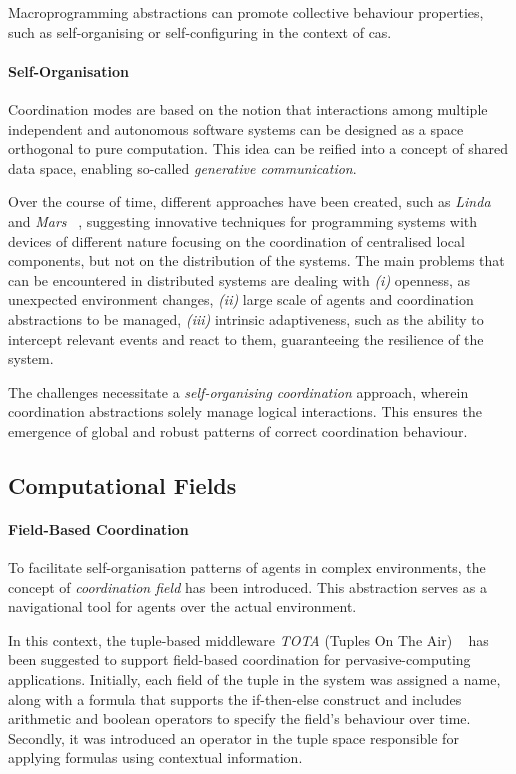 Macroprogramming abstractions can promote collective behaviour properties, such as self-organising or self-configuring in
the context of \ac{cas}.

\paragraph{Self-Organisation}
Coordination modes are based on the notion that interactions among multiple independent and autonomous software systems
can be designed as a space orthogonal to pure computation.
This idea can be reified into a concept of shared data space, enabling so-called \emph{generative communication}.

Over the course of time, different approaches have been created, such as \emph{Linda} ~\cite{10.1145/2363.2433} and \emph{Mars} ~\cite{865084},
suggesting innovative techniques for programming systems with devices of different nature focusing on the coordination
of centralised local components, but not on the distribution of the systems.
The main problems that can be encountered in distributed systems are dealing with
    \emph{(i)} openness, as unexpected environment changes,
    \emph{(ii)} large scale of agents and coordination abstractions to be managed,
    \emph{(iii)} intrinsic adaptiveness, such as the ability to intercept relevant events and react to them, guaranteeing
        the resilience of the system.

The challenges necessitate a \emph{self-organising coordination} approach, wherein coordination abstractions solely
manage logical interactions.
This ensures the emergence of global and robust patterns of correct coordination behaviour.


\subsection{Computational Fields}
\label{subsec:computational-fields}

\paragraph{Field-Based Coordination}
To facilitate self-organisation patterns of agents in complex environments, the concept of \emph{coordination field}
has been introduced.
This abstraction serves as a navigational tool for agents over the actual environment.

In this context, the tuple-based middleware \emph{TOTA} (Tuples On The Air) ~\cite{10.1145/1538942.1538945}
has been suggested to support field-based coordination for pervasive-computing applications.
Initially, each field of the tuple in the system was assigned a name, along with a formula that supports the
if-then-else construct and includes arithmetic and boolean operators to specify the field's behaviour over time.
Secondly, it was introduced an operator in the tuple space responsible for applying formulas using contextual information.\\

